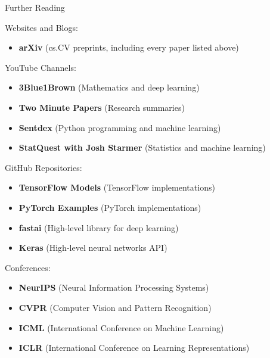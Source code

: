 \begin{frame}{Further Reading}
\begin{block}{Websites and Blogs:}
\begin{itemize}
        \item \textbf{arXiv} (cs.CV preprints, including every paper listed above)
    \end{itemize}
\end{block}
\framebreak
\begin{block}{YouTube Channels:}
    \begin{itemize}
        \item \textbf{3Blue1Brown} (Mathematics and deep learning)
        \item \textbf{Two Minute Papers} (Research summaries)
        \item \textbf{Sentdex} (Python programming and machine learning)
        \item \textbf{StatQuest with Josh Starmer} (Statistics and machine learning)
    \end{itemize}
\end{block}
\framebreak
\begin{block}{GitHub Repositories:}
    \begin{itemize}
        \item \textbf{TensorFlow Models} (TensorFlow implementations)
        \item \textbf{PyTorch Examples} (PyTorch implementations)
        \item \textbf{fastai} (High-level library for deep learning)
        \item \textbf{Keras} (High-level neural networks API)
    \end{itemize}
\end{block}
\framebreak
\begin{block}{Conferences:}
    \begin{itemize}
        \item \textbf{NeurIPS} (Neural Information Processing Systems)
        \item \textbf{CVPR} (Computer Vision and Pattern Recognition)
        \item \textbf{ICML} (International Conference on Machine Learning)
        \item \textbf{ICLR} (International Conference on Learning Representations)
    \end{itemize}
\end{block}
\end{frame}